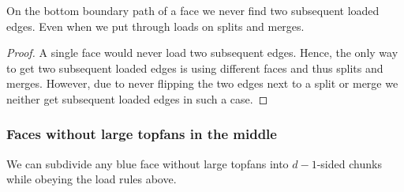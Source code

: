   \begin{lemma}
    \label{lm:}
    On the bottom boundary path of a face we never find two subsequent loaded edges. Even when we put through loads on splits and merges.
  \end{lemma}
  \begin{proof}
    A single face would never load two subsequent edges. Hence, the only way to get two subsequent loaded edges is using different faces and thus splits and merges.
    However, due to never flipping the two edges next to a split or merge we neither get subsequent loaded edges in such a case.
  \end{proof}


\subsubsection{Faces without large topfans in the middle}
  \begin{lemma}
    \label{lm:subdiv:withoutTopfan}
    We can subdivide any blue face without large topfans into $d-1$-sided chunks while obeying the load rules above.
  \end{lemma}

